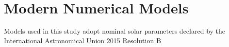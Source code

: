 \section{Modern Numerical Models}
Models used in this study adopt nominal solar parameters declared by the International Astronomical Union 2015 Resolution B